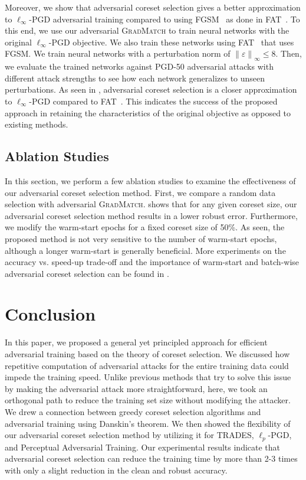 \documentclass[runningheads]{llncs}
\newcommand{\norm}[1]{\left\lVert#1\right\rVert}
\begin{document}
Moreover, we show that adversarial coreset selection gives a better approximation to $\ell_\infty$-PGD adversarial training compared to using FGSM~\cite{goodfellow2014explaining} as done in FAT~\cite{wong2020fast}.
To this end, we use our adversarial \textsc{GradMatch} to train neural networks with the original $\ell_\infty$-PGD objective.
We also train these networks using FAT~\cite{wong2020fast} that uses FGSM.
We train neural networks with a perturbation norm of $\norm{\varepsilon}_\infty \leq 8$.
Then, we evaluate the trained networks against PGD-50 adversarial attacks with different attack strengths to see how each network generalizes to unseen perturbations.
As seen in , adversarial coreset selection is a closer approximation to $\ell_\infty$-PGD compared to FAT~\cite{wong2020fast}.
This indicates the success of the proposed approach in retaining the characteristics of the original objective as opposed to existing methods.

\subsection{Ablation Studies}
In this section, we perform a few ablation studies to examine the effectiveness of our adversarial coreset selection method.
First, we compare a random data selection with adversarial \textsc{GradMatch}.
 shows that for any given coreset size, our adversarial coreset selection method results in a lower robust error.
Furthermore, we modify the warm-start epochs for a fixed coreset size of 50\%.
As seen, the proposed method is not very sensitive to the number of warm-start epochs, although a longer warm-start is generally beneficial.
More experiments on the accuracy vs. speed-up trade-off and the importance of warm-start and batch-wise adversarial coreset selection can be found in .

\section{Conclusion}\label{sec:conclusion}
In this paper, we proposed a general yet principled approach for efficient adversarial training based on the theory of coreset selection.
We discussed how repetitive computation of adversarial attacks for the entire training data could impede the training speed.
Unlike previous methods that try to solve this issue by making the adversarial attack more straightforward, here, we took an orthogonal path to reduce the training set size without modifying the attacker.
We drew a connection between greedy coreset selection algorithms and adversarial training using Danskin's theorem.
We then showed the flexibility of our adversarial coreset selection method by utilizing it for TRADES, $\ell_p$-PGD, and Perceptual Adversarial Training.
Our experimental results indicate that adversarial coreset selection can reduce the training time by more than 2-3 times with only a slight reduction in the clean and robust accuracy.
\end{document}
